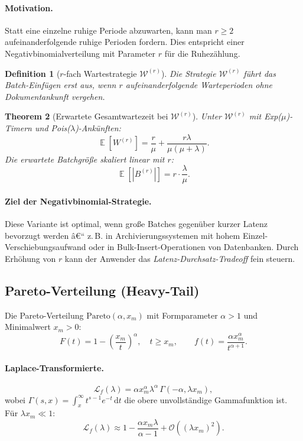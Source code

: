 ﻿\documentclass[12pt, a4paper]{article}
\newtheorem{theorem}{Theorem}[section]
\newtheorem{definition}[theorem]{Definition}
\DeclareMathOperator{\E}{\mathbb{E}}
\newcommand{\Pareto}{\mathrm{Pareto}}
\begin{document}
\paragraph{Motivation.}
Statt eine einzelne ruhige Periode abzuwarten, kann man $r \geq 2$ aufeinanderfolgende
ruhige Perioden fordern. Dies entspricht einer Negativbinomialverteilung mit
Parameter $r$ für die Ruhezählung.

\begin{definition}[$r$-fach Wartestrategie $\mathcal{W}^{(r)}$]
Die Strategie $\mathcal{W}^{(r)}$ führt das Batch-Einfügen erst aus, wenn
$r$ aufeinanderfolgende Warteperioden ohne Dokumentankunft vergehen.
\end{definition}

\begin{theorem}[Erwartete Gesamtwartezeit bei $\mathcal{W}^{(r)}$]
\label{thm:negbin}
Unter $\mathcal{W}^{(r)}$ mit Exp($\mu$)-Timern und Pois($\lambda$)-Ankünften:
\[
  \E[W^{(r)}] = \frac{r}{\mu} + \frac{r\lambda}{\mu(\mu+\lambda)}.
\]
Die erwartete Batchgröße skaliert linear mit $r$:
\[
  \E[|B^{(r)}|] = r \cdot \frac{\lambda}{\mu}.
\]
\end{theorem}

\paragraph{Ziel der Negativbinomial-Strategie.}
Diese Variante ist optimal, wenn große Batches gegenüber kurzer Latenz
bevorzugt werden â€“ z.\,B. in Archivierungssystemen mit hohem Einzel-
Verschiebungsaufwand oder in Bulk-Insert-Operationen von Datenbanken.
Durch Erhöhung von $r$ kann der Anwender das \emph{Latenz-Durchsatz-Tradeoff}
fein steuern.

\subsection{Pareto-Verteilung (Heavy-Tail)}\label{subsec:pareto}

Die Pareto-Verteilung $\Pareto(\alpha, x_m)$ mit Formparameter $\alpha > 1$
und Minimalwert $x_m > 0$:
\[
  F(t) = 1 - \left(\frac{x_m}{t}\right)^\alpha, \quad t \geq x_m,
  \qquad
  f(t) = \frac{\alpha x_m^\alpha}{t^{\alpha+1}}.
\]

\paragraph{Laplace-Transformierte.}
\[
  \mathcal{L}_f(\lambda) = \alpha x_m^\alpha \lambda^\alpha
  \, \Gamma(-\alpha, \lambda x_m),
\]
wobei $\Gamma(s, x) = \int_x^\infty t^{s-1} e^{-t}\,\mathrm{d}t$ die obere
unvollständige Gammafunktion ist. Für $\lambda x_m \ll 1$:
\[
  \mathcal{L}_f(\lambda) \approx 1 - \frac{\alpha x_m \lambda}{\alpha - 1} +
  \mathcal{O}((\lambda x_m)^2).
\]
\end{document}
